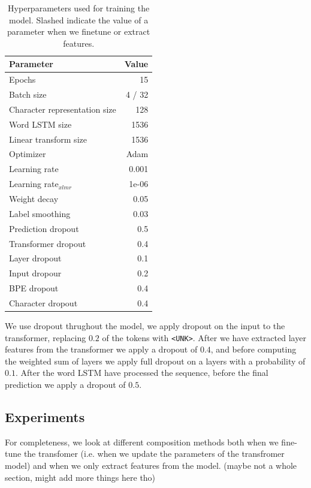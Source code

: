 \documentclass[11pt]{article}
\begin{document}
	\begin{table}[h]
		\centering
		\begin{tabular}{lr}
			Parameter & Value \\
			\hline
			Epochs & 15 \\
			Batch size & 4 / 32 \\
			Character representation size & 128 \\
            Word LSTM size & 1536 \\
            Linear transform size & 1536 \\
			Optimizer & Adam \\
			Learning rate & 0.001 \\
			Learning rate$_{xlmr}$ & 1e-06 \\
            Weight decay & 0.05 \\
			Label smoothing & 0.03 \\
            Prediction dropout & 0.5 \\
			Transformer dropout & 0.4 \\
            Layer dropout & 0.1 \\
            Input dropour & 0.2 \\
            BPE dropout & 0.4 \\
            Character dropout & 0.4 \\
		\end{tabular}
		\caption{\label{tab:parameters} Hyperparameters used for training the model. Slashed indicate the value of a parameter when we finetune or extract features.}
	\end{table}

        We use dropout thrughout the model, we apply dropout on the
     input to the transformer, replacing $0.2$ of the tokens with
     \texttt{<UNK>}. After we have extracted layer features from the
     transformer we apply a dropout of $0.4$, and before computing the
     weighted sum of layers we apply full dropout on a layers with a
     probability of $0.1$. After the word LSTM have processed the
     sequence, before the final prediction we apply a dropout of
     $0.5$.

    \subsection{Experiments}

        For completeness, we look at different composition methods
     both when we fine-tune the transfomer (i.e. when we update the
     parameters of the transfromer model) and when we only extract
     features from the model. (maybe not a whole section, might add more things here tho)
\end{document}
